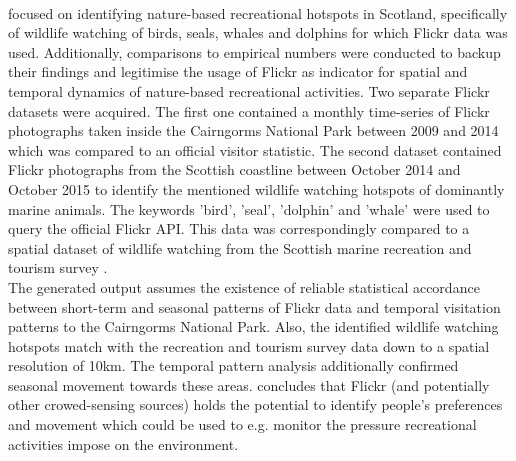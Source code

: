 \paragraph*{\textcite{Mancini2018}} focused on identifying nature-based recreational hotspots in Scotland, specifically of wildlife watching of birds, seals, whales and dolphins for which Flickr data was used. Additionally, comparisons to empirical numbers were conducted to backup their findings and legitimise the usage of Flickr as indicator for spatial and temporal dynamics of nature-based recreational activities.
Two separate Flickr datasets were acquired. The first one contained a monthly time-series of Flickr photographs taken inside the Cairngorms National Park between 2009 and 2014 which was compared to an official visitor statistic. The second dataset contained Flickr photographs from the Scottish coastline between October 2014 and October 2015 to identify the mentioned wildlife watching hotspots of dominantly marine animals. The keywords 'bird', 'seal', 'dolphin' and 'whale' were used to query the official Flickr API. This data was correspondingly compared to a spatial dataset of wildlife watching from the Scottish marine recreation and tourism survey \parencite{LUC2016}. \\
The generated output assumes the existence of reliable statistical accordance between short-term and seasonal patterns of Flickr data and temporal visitation patterns to the Cairngorms National Park.  
Also, the identified wildlife watching hotspots match with the recreation and tourism survey data down to a spatial resolution of 10km. The temporal pattern analysis additionally confirmed seasonal movement towards these areas. \textcite{Mancini2018} concludes that Flickr (and potentially other crowed-sensing sources) holds the potential to identify people's preferences and movement which could be used to e.g. monitor the pressure recreational activities impose on the environment.

